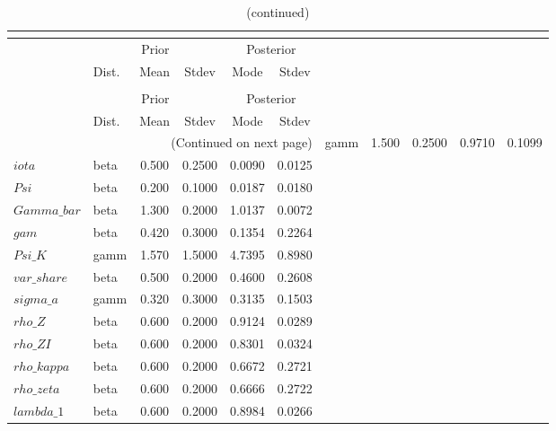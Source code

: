 
\begin{center}
\begin{longtable}{llcccc} 
\caption{Results from posterior maximization (parameters)}\\
 \label{Table:Posterior:1}\\
\toprule 
  & \multicolumn{3}{c}{Prior}  &  \multicolumn{2}{c}{Posterior} \\
  \cmidrule(r{.75em}){2-4} \cmidrule(r{.75em}){5-6}
  & Dist. & Mean  & Stdev & Mode & Stdev \\ 
\midrule \endfirsthead 
\caption{(continued)}\\
 \bottomrule 
  & \multicolumn{3}{c}{Prior}  &  \multicolumn{2}{c}{Posterior} \\
  \cmidrule(r{.75em}){2-4} \cmidrule(r{.75em}){5-6}
  & Dist. & Mean  & Stdev & Mode & Stdev \\ 
\midrule \endhead 
\bottomrule \multicolumn{6}{r}{(Continued on next page)}\endfoot 
\bottomrule\endlastfoot 
$sigma$ & gamm &   1.500 & 0.2500 &   0.9710 &  0.1099 \\ 
$iota$ & beta &   0.500 & 0.2500 &   0.0090 &  0.0125 \\ 
$Psi$ & beta &   0.200 & 0.1000 &   0.0187 &  0.0180 \\ 
$Gamma\_bar$ & beta &   1.300 & 0.2000 &   1.0137 &  0.0072 \\ 
$gam$ & beta &   0.420 & 0.3000 &   0.1354 &  0.2264 \\ 
$Psi\_K$ & gamm &   1.570 & 1.5000 &   4.7395 &  0.8980 \\ 
$var\_share$ & beta &   0.500 & 0.2000 &   0.4600 &  0.2608 \\ 
$sigma\_a$ & gamm &   0.320 & 0.3000 &   0.3135 &  0.1503 \\ 
$rho\_Z$ & beta &   0.600 & 0.2000 &   0.9124 &  0.0289 \\ 
$rho\_ZI$ & beta &   0.600 & 0.2000 &   0.8301 &  0.0324 \\ 
$rho\_kappa$ & beta &   0.600 & 0.2000 &   0.6672 &  0.2721 \\ 
$rho\_zeta$ & beta &   0.600 & 0.2000 &   0.6666 &  0.2722 \\ 
$lambda\_1$ & beta &   0.600 & 0.2000 &   0.8984 &  0.0266 \\ 
\end{longtable}
 \end{center}
